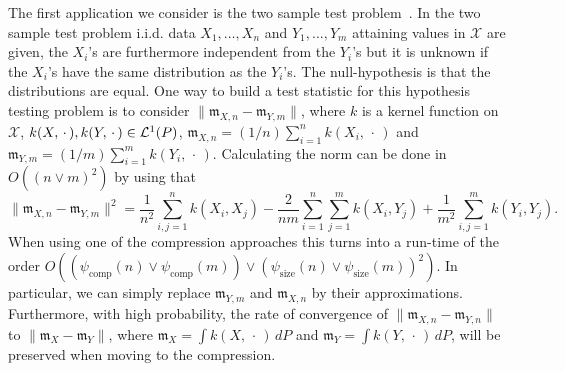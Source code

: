 \documentclass[10pt]{amsart}
\theoremstyle{definition}\newtheorem{defi}[theo]{Definition}\newtheorem{rema}[theo]{Remark}\newtheorem{exam}[theo]{Example}\newtheorem{exem}[theo]{Example}\newtheorem{nota}[theo]{Notation}
\theoremstyle{remark}
\newcommand{\compp}{\mathrm{comp}}
\newcommand{\ssize}{\mathrm{size}}
\newcommand{\X}{\mathcal{X}}
\newcommand{\clL}{\mathcal{L}}
\newcommand{\mean}{\mathfrak{m}}
\begin{document}
The first application we consider is the two sample test problem~\cite{GRET12}. In the two sample test problem i.i.d. data $X_1,\dots, X_n$ and $Y_1, \dots, Y_m$ attaining values in $\X$ are given, the $X_i$'s are furthermore independent from the $Y_i$'s but it is unknown if the $X_i$'s have the same distribution as the $Y_i$'s. The null-hypothesis is that the distributions are equal. One way to build a test statistic for this hypothesis testing problem is to consider $\| \mean_{X,n} - \mean_{Y,m}\|$, where $k$ is a kernel function on $\X$, $k(X,\,\cdot\,),\linebreak k(Y,\,\cdot\,) \in \clL^1(P)$, $\mean_{X,n} = (1/n) \sum_{i=1}^n k(X_i,\,\cdot\,)$ and $\mean_{Y,m} = (1/m) \sum_{i=1}^m k(Y_i,\,\cdot\,)$. Calculating the norm can be done in $O((n\vee m)^2)$ by using that
\[
\|\mean_{X,n} - \mean_{Y,m}\|^2 = \frac{1}{n^2}\sum_{i,j=1}^n k(X_i,X_j) - \frac{2}{nm} \sum_{i=1}^n \sum_{j=1}^m k(X_i,Y_j) + \frac{1}{m^2} \sum_{i,j=1}^m k(Y_i,Y_j).
\]
When using one of the compression approaches this turns into a run-time of the order $O((\psi_{\compp}(n) \vee \psi_{\compp}(m)) \vee (\psi_{\ssize}(n) \vee \psi_{\ssize}(m))^2)$. In particular, we can simply replace $\mean_{Y,m}$ and $\mean_{X,n}$ by their approximations. Furthermore, with high probability, the rate of convergence of $\|\mean_{X,n} - \mean_{Y,n}\|$ to $\|\mean_X - \mean_Y\|$, where $\mean_X = \int k(X,\,\cdot\,) \, dP$ and $\mean_Y = \int k(Y,\,\cdot\,) \, dP$, will be preserved when moving to the compression.
\end{document}
